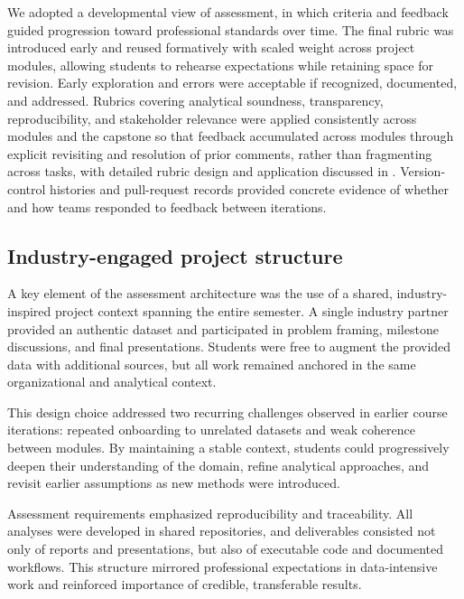We adopted a developmental view of assessment, in which criteria and feedback guided progression toward professional standards over time. The final rubric was introduced early and reused formatively with scaled weight across project modules, allowing students to rehearse expectations while retaining space for revision. Early exploration and errors were acceptable if recognized, documented, and addressed. Rubrics covering analytical soundness, transparency, reproducibility, and stakeholder relevance were applied consistently across modules and the capstone so that feedback accumulated across modules through explicit revisiting and resolution of prior comments, rather than fragmenting across tasks, with detailed rubric design and application discussed in \textcite{Ingimundardottir2026PRassessment}. Version-control histories and pull-request records provided concrete evidence of whether and how teams responded to feedback between iterations.

\subsection{Industry-engaged project structure}

A key element of the assessment architecture was the use of a shared, industry-inspired project context spanning the entire semester. A single industry partner provided an authentic dataset and participated in problem framing, milestone discussions, and final presentations. Students were free to augment the provided data with additional sources, but all work remained anchored in the same organizational and analytical context.

This design choice addressed two recurring challenges observed in earlier course iterations: repeated onboarding to unrelated datasets and weak coherence between modules. By maintaining a stable context, students could progressively deepen their understanding of the domain, refine analytical approaches, and revisit earlier assumptions as new methods were introduced.

Assessment requirements emphasized reproducibility and traceability. All analyses were developed in shared repositories, and deliverables consisted not only of reports and presentations, but also of executable code and documented workflows. This structure mirrored professional expectations in data-intensive work and reinforced importance of credible, transferable results.

